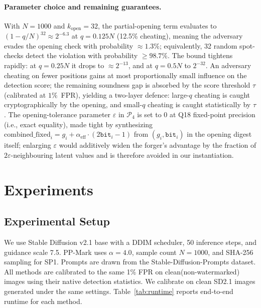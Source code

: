 \documentclass{article}
\theoremstyle{plain}
\theoremstyle{definition}
\theoremstyle{remark}
\begin{document}
\paragraph{Parameter choice and remaining guarantees.} With $N=1000$ and $k_{\mathrm{open}}=32$, the partial-opening term evaluates to $(1 - q/N)^{32} \approx 2^{-6.3}$ at $q = 0.125 N$ (12.5\% cheating), meaning the adversary evades the opening check with probability ${\approx}1.3\%$; equivalently, 32 random spot-checks detect the violation with probability ${\geq}98.7\%$. The bound tightens rapidly: at $q = 0.25 N$ it drops to ${\approx}2^{-13}$, and at $q = 0.5 N$ to $2^{-32}$. An adversary cheating on fewer positions gains at most proportionally small influence on the detection score; the remaining soundness gap is absorbed by the score threshold $\tau$ (calibrated at $1\%$~FPR), yielding a two-layer defence: large-$q$ cheating is caught cryptographically by the opening, and small-$q$ cheating is caught statistically by $\tau$. The opening-tolerance parameter $\varepsilon$ in $\mathcal{P}_4$ is set to $0$ at Q18 fixed-point precision (i.e., exact equality), made tight by synthesizing $\mathrm{combined\_fixed}_i = g_i + \alpha_{\mathrm{eff}} \cdot (2\mathtt{bit}_i - 1)$ from $(g_i, \mathtt{bit}_i)$ in the opening digest itself; enlarging $\varepsilon$ would additively widen the forger's advantage by the fraction of $2\varepsilon$-neighbouring latent values and is therefore avoided in our instantiation.

\section{Experiments}
\subsection{Experimental Setup}
We use Stable Diffusion v2.1 base with a DDIM scheduler, 50 inference steps, and guidance scale 7.5. PP-Mark uses $\alpha=4.0$, sample count $N=1000$, and SHA-256 sampling for SP1. Prompts are drawn from the Stable-Diffusion-Prompts dataset. All methods are calibrated to the same 1\% FPR on clean(non-watermarked) images using their native detection statistics. We calibrate on clean SD2.1 images generated under the same settings.
Table~\ref{tab:runtime} reports end-to-end runtime for each method.
\end{document}
